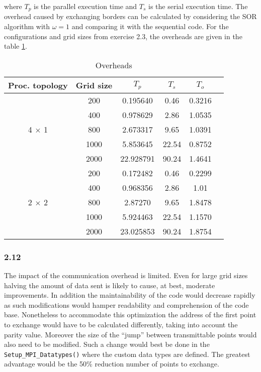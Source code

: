 where $ T_p $ is the parallel execution time and $ T_s $ is the serial execution time. The overhead caused by exchanging borders can be calculated by considering the SOR algorithm with $\omega=1$ and comparing it with the sequential code. For the configurations and grid sizes from exercise 2.3, the overheads are given in the table \ref{overhead}. \\
\begin{table}[h!]
  \centering
  \begin{tabular}{|c|c|c|c|c|c|}
    \hline
    Proc. topology & Grid size & $ T_p $ & $ T_s $ & $ T_o $ \\
    \hline
                   & 200 & 0.195640 & 0.46 & 0.3216 \\
                   & 400 & 0.978629 & 2.86 & 1.0535 \\
    4 $ \times $ 1 & 800 & 2.673317 & 9.65 & 1.0391 \\
                   & 1000 & 5.853645 & 22.54 & 0.8752 \\
                   & 2000 & 22.928791 & 90.24 & 1.4641 \\	
    \hline	
                   & 200 & 0.172482 & 0.46 & 0.2299 \\
                   & 400 & 0.968356 & 2.86 & 1.01 \\
    2 $ \times $ 2 & 800 & 2.87270 & 9.65 & 1.8478 \\
                   & 1000 & 5.924463 & 22.54 & 1.1570 \\
                   & 2000 & 23.025853 & 90.24 & 1.8754 \\	
    \hline
  \end{tabular}
  \caption{Overheads}
  \label{overhead}
\end{table}

\subsubsection*{2.12}
The impact of the communication overhead is limited. Even for large grid sizes halving the amount of data sent is likely to cause, at best, moderate improvements. In addition the maintainability of the code would decrease rapidly as such modifications would hamper readability and comprehension of the code base.
Nonetheless to accommodate this optimization the address of the first point to exchange would have to be calculated differently, taking into account the parity value. Moreover the size of the “jump” between transmittable points would also need to be modified. Such a change would best be done in the \texttt{Setup\_MPI\_Datatypes()} where the custom data types are defined. The greatest advantage would be the 50\% reduction number of points to exchange.



